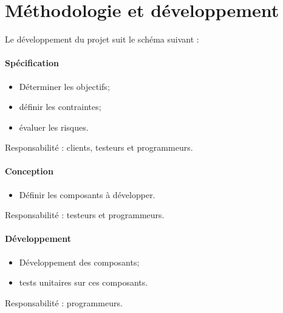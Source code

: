 \documentclass[a4paper,11pt,french]{article}
\begin{document}
\section{Méthodologie et développement}
Le développement du projet suit le schéma suivant : \\

\begin{center}
\end{center}

\paragraph{Spécification}
\begin{itemize}
 \item Déterminer les objectifs;
 \item définir les contraintes;
 \item évaluer les risques.
\end{itemize}
Responsabilité : clients, testeurs et programmeurs.

\paragraph{Conception}
\begin{itemize}
 \item Définir les composants à développer.
\end{itemize}
Responsabilité : testeurs et programmeurs.

\paragraph{Développement}
\begin{itemize}
 \item Développement des composants;
 \item tests unitaires sur ces composants.
\end{itemize}
Responsabilité : programmeurs.
\end{document}
